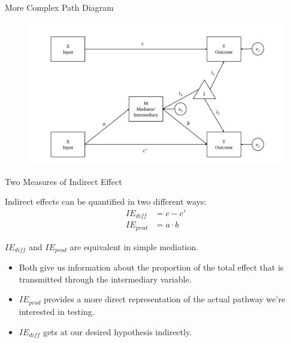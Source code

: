 \documentclass{beamer}
\newcommand{\va}[0]{\vspace{12pt}}
\newcommand{\vb}[0]{\vspace{6pt}}
\begin{document}
\begin{frame}{More Complex Path Diagram}

\begin{figure}
\includegraphics[width=\textwidth]{figures/complexMediationPathDiagram.pdf}
\end{figure}

\end{frame}


\begin{frame}{Two Measures of Indirect Effect}

Indirect effects can be quantified in two different ways:
\begin{align}
IE_{diff} &= c - c'\\
IE_{prod} &= a \cdot b
\end{align}

$IE_{diff}$ and $IE_{prod}$ are equivalent in simple mediation.
\va
\begin{itemize}
\item Both give us information about the proportion of the total
  effect that is transmitted through the intermediary variable.
  \vb
\item $IE_{prod}$ provides a more direct representation of the
  actual pathway we're interested in testing.
  \vb
\item $IE_{diff}$ gets at our desired hypothesis indirectly.
\end{itemize}

\end{frame}
\end{document}

